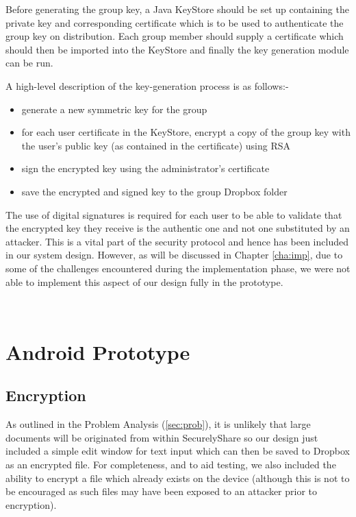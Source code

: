 Before generating the group key, a Java KeyStore should be set up containing the private key and corresponding certificate which is to be used to authenticate the group key on distribution.  Each group member should supply a certificate which should then be imported into the KeyStore and finally the key generation module can be run.  

A high-level description of the key-generation process is as follows:-
\begin{itemize}
\item generate a new  symmetric key for the group
\item for each user certificate in the KeyStore, encrypt a copy of the group key with the user's public key (as contained in the certificate) using RSA
\item sign the encrypted key using the administrator's certificate
\item save the encrypted and signed key to the group Dropbox folder 
\end{itemize}

The use of digital signatures is required for each user to be able to validate that the encrypted key they receive is the authentic one and not one substituted by an attacker.  This  is a vital part of the  security protocol and hence has been included in our  system design.  However, as will be discussed in Chapter \ref{cha:imp}, due to some of the challenges encountered during the implementation phase, we were not able to implement this aspect of our design fully in the prototype.

\\

\section{Android Prototype }




\subsection*{Encryption }
As outlined in the Problem Analysis  (\ref{sec:prob}), it is unlikely that large documents will be originated from within SecurelyShare so our design just included a simple  edit window for text input which can then be saved to Dropbox as an encrypted file.  For completeness, and to aid testing, we also included the ability to encrypt a file which already exists on the device (although this is not to be encouraged as such files may have been exposed to an attacker prior to encryption).



